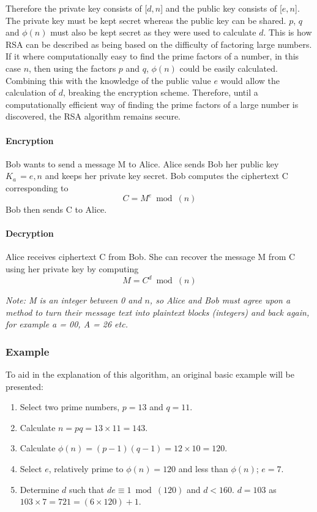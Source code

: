 \documentclass[a4paper,10pt]{report}
\begin{document}
Therefore the private key consists of [$d,n$] and the public key consists of [$e,n$]. The private key must be kept secret whereas the public key can be shared. $p$, $q$ and $ \phi(n) $ must also be kept secret as they were used to calculate $d$. This is how RSA can be described as being based on the difficulty of factoring large numbers. If it where computationally easy to find the prime factors of a number, in this case $n$, then using the factors $p$ and $q$, $\phi(n)$ could be easily calculated. Combining this with the knowledge of the public value $e$ would allow the calculation of $d$, breaking the encryption scheme. Therefore, until a computationally efficient way of finding the prime factors of a large number is discovered, the RSA algorithm remains secure. 


\paragraph{Encryption}

Bob wants to send a message M to Alice. Alice sends Bob her public key $ K_{a} \, = {e,n} $ and keeps her private key secret. Bob computes the ciphertext C corresponding to
\[ C = M^{e} \bmod(n) \]
Bob then sends C to Alice.

\paragraph{Decryption}

Alice receives ciphertext C from Bob. She can recover the message M from C using her private key by computing
\[ M = C^{d} \bmod(n) \]

\textit{Note: M is an integer between 0 and $n$, so Alice and Bob must agree upon a method to turn their message text into plaintext blocks (integers) and back again, for example a = 00, A = 26 etc.}

\subsubsection{Example}

To aid in the explanation of this algorithm, an original basic example will be presented:

\begin{enumerate}
 \item Select two prime numbers, $p=13$ and $q=11$.
 \item Calculate $n=pq=13\times11=143$.
 \item Calculate $\phi(n)=(p-1)(q-1)=12\times10 = 120$.
 \item Select $e$, relatively prime to $\phi(n)=120$ and less than $\phi(n)$; $e=7$.
 \item Determine $d$ such that $de \equiv 1 \bmod(120)$ and $d < 160$. $d = 103$ as $103 \times 7 = 721 = (6 \times 120) + 1$.
\end{enumerate}
\end{document}
